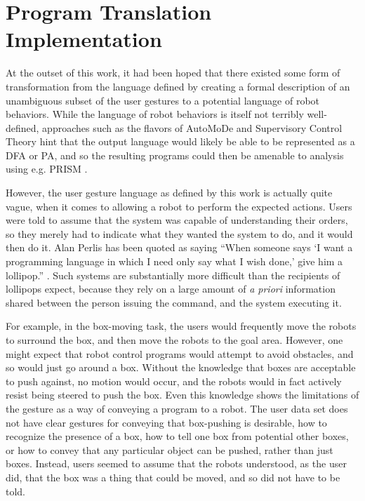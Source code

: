 \chapter{Program Translation Implementation}

At the outset of this work, it had been hoped that there existed some form of transformation from the language defined by creating a formal description of an unambiguous subset of the user gestures to a potential language of robot behaviors. 
While the language of robot behaviors is itself not terribly well-defined, approaches such as the flavors of AutoMoDe and Supervisory Control Theory hint that the output language would likely be able to be represented as a DFA or PA, and so the resulting programs could then be amenable to analysis using e.g. PRISM \citep{KNP11}.

However, the user gesture language as defined by this work is actually quite vague, when it comes to allowing a robot to perform the expected actions. 
Users were told to assume that the system was capable of understanding their orders, so they merely had to indicate what they wanted the system to do, and it would then do it. 
Alan Perlis has been quoted as saying ``When someone says `I want a programming language in which I need only say what I wish done,' give him a lollipop.'' \citep{PerlisYaleLolz}.  
Such systems are substantially more difficult than the recipients of lollipops expect, because they rely on a large amount of \emph{a priori} information shared between the person issuing the command, and the system executing it. 

For example, in the box-moving task, the users would frequently move the robots to surround the box, and then move the robots to the goal area. 
However, one might expect that robot control programs would attempt to avoid obstacles, and so would just go around a box. 
Without the knowledge that boxes are acceptable to push against, no motion would occur, and the robots would in fact actively resist being steered to push the box. 
Even this knowledge shows the limitations of the gesture as a way of conveying a program to a robot.
The user data set does not have clear gestures for conveying that box-pushing is desirable, how to recognize the presence of a box, how to tell one box from potential other boxes, or how to convey that any particular object can be pushed, rather than just boxes. 
Instead, users seemed to assume that the robots understood, as the user did, that the box was a thing that could be moved, and so did not have to be told.

